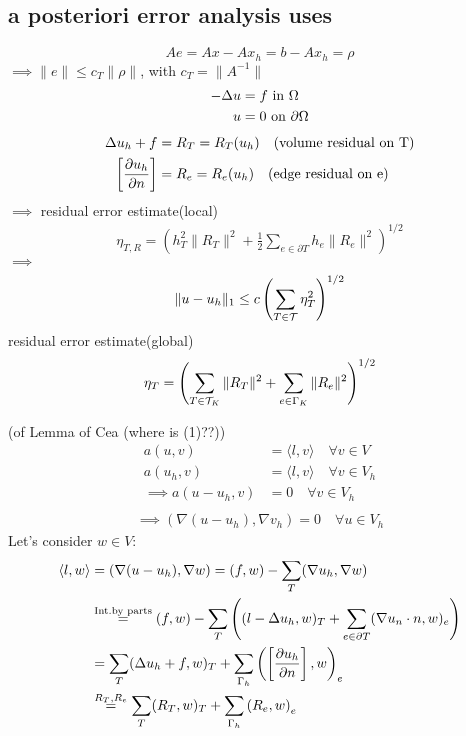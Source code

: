 \subsection{a posteriori error analysis uses}
\begin{equation*}
	Ae = Ax-Ax_h = b - Ax_h = \rho
\end{equation*}
$\implies \|e\| \leq c_T \|\rho\|$, with $c_T = \|A^{-1}\|$
\begin{align*}
	-\Delta u &= f \text{ in } \Omega \\
	u &= 0 \text{ on } \partial \Omega
\end{align*}
\begin{align*}
	\Delta u_h +f &= R_T= R_T(u_h) \quad (\text{volume residual on T}) \\
	\left[\frac{\partial u_h}{\partial n}\right] &= R_e= R_e(u_h) \quad (\text{edge residual on e}) \\
\end{align*}
$\implies$ residual error estimate(local)
\begin{align*}
	\eta_{T,R} = \left( h_T^2 \|R_T\|^2  + \frac{1}{2}\displaystyle \sum_{e\in \partial T}  h_e \|R_e\|^2\right)^{1/2}
\end{align*}
$\implies$ 
\begin{align*}
	\|u-u_h\|_1 \leq c \left( \sum \limits_{T \in \mathcal{T}} \eta_T^2 \right)^{1/2}
\end{align*}
residual error estimate(global)
\begin{equation*}
	\eta_T = \left(  \sum \limits_{T \in \mathcal{T}_K} \|R_T\|^2  +  \sum \limits_{e \in \Gamma_K} \|R_e\|^2 \right)^{1/2}
\end{equation*}
\begin{proof_}
	(of Lemma of Cea (where is (1)??))\\
	\begin{align*}
		a(u,v) &= \langle l,v\rangle\quad \forall v\in V \\
		a(u_h,v) &=\langle l,v\rangle \quad \forall v\in V_h \\
		\implies a(u-u_h,v) &=0 \quad \forall v\in V_h \\
	\end{align*}
	\begin{align}
		\implies ( \nabla(u-u_h),\nabla v_h )  =0 \quad \forall u \in V_h 
	\end{align} 
	Let's consider $w \in V$:
	\begin{align*}
		\langle l,w\rangle &= (\nabla(u-u_h),\nabla w) = (f,w) - \sum\limits_T (\nabla u_h,\nabla w)\\
		&\stackrel{\text{Int.by parts}}{=} (f,w) - \sum \limits_T \left( (l-\Delta u_h,w)_T + \sum \limits_{e\in\partial T} (\nabla u_n \cdot n,w)_e \right)\\
		&= \sum \limits_T  (\Delta u_h +f,w)_T + \sum \limits_{\Gamma_h} \left(\left[\frac{\partial u_h}{\partial n}\right],w\right)_e \\
		&\stackrel{R_T,R_e}{=} \sum \limits_T  (R_T,w)_T + \sum \limits_{\Gamma_h} \left(R_e,w\right)_e
	\end{align*}
\end{proof_}

